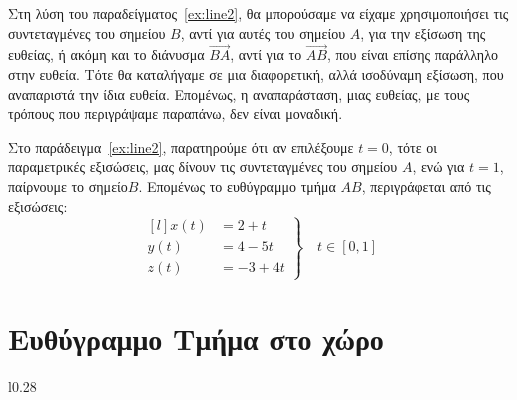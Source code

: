\begin{rem}
  Στη λύση του παραδείγματος~\ref{ex:line2}, θα μπορούσαμε να είχαμε χρησιμοποιήσει 
  τις συντεταγμένες του σημείου $ B $, αντί για αυτές του σημείου $A$, για την εξίσωση 
  της ευθείας, ή ακόμη και το διάνυσμα $ \vec{BA} $, αντί για το $ \vec{AB} $, που 
  είναι επίσης παράλληλο στην ευθεία. Τότε θα καταλήγαμε σε μια διαφορετική, αλλά 
  ισοδύναμη εξίσωση, που αναπαριστά την ίδια ευθεία. Επομένως, η αναπαράσταση, μιας 
  ευθείας, με τους τρόπους που περιγράψαμε παραπάνω, δεν είναι μοναδική.
\end{rem}
\begin{rem}
  Στο παράδειγμα~\ref{ex:line2}, παρατηρούμε ότι αν επιλέξουμε $ t=0 $, τότε οι 
  παραμετρικές εξισώσεις, μας δίνουν τις συντεταγμένες του σημείου $ A $, ενώ για 
  $ t=1 $, παίρνουμε το σημείο$ B $. Επομένως το ευθύγραμμο τμήμα $ AB $, 
  περιγράφεται από τις εξισώσεις:
  \[
    \left.
      \begin{matrix*}[l]
        x(t) &= 2+t \\
        y(t) &= 4-5t \\
        z(t) &= -3+4t
      \end{matrix*} 
    \right\} \quad  t \in [0,1]
  \]
\end{rem}


\section*{Ευθύγραμμο Τμήμα στο χώρο}

\begin{wrapfigure}{l}{0.28\linewidth}
\end{wrapfigure}

